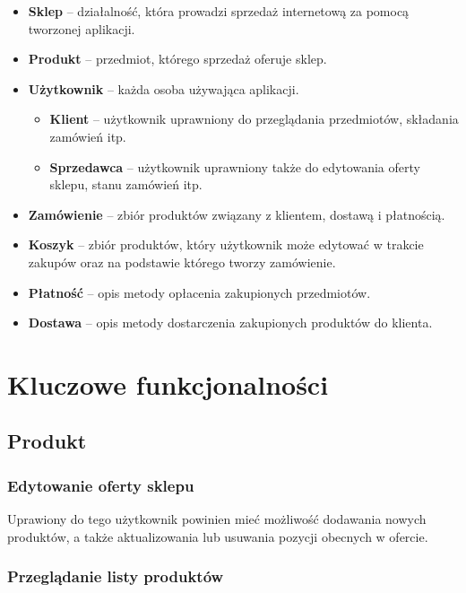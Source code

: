 \documentclass[a4paper]{article}
\begin{document}
\begin{itemize}
	\item \textbf{Sklep} -- działalność, która prowadzi sprzedaż internetową za pomocą 
	tworzonej aplikacji.
	\item \textbf{Produkt} -- przedmiot, którego sprzedaż oferuje sklep.
	\item \textbf{Użytkownik} -- każda osoba używająca aplikacji.
	\begin{itemize}
		\item \textbf{Klient} -- użytkownik uprawniony do przeglądania przedmiotów, 
		składania zamówień itp.
		\item \textbf{Sprzedawca} -- użytkownik uprawniony także do edytowania oferty 
		sklepu, stanu zamówień itp.
	\end{itemize}
	\item \textbf{Zamówienie} -- zbiór produktów związany z klientem, dostawą i 
	płatnością.
	\item \textbf{Koszyk} -- zbiór produktów, który użytkownik może edytować w trakcie 
	zakupów oraz na podstawie którego tworzy zamówienie.
	\item \textbf{Płatność} -- opis metody opłacenia zakupionych przedmiotów.
	\item \textbf{Dostawa} -- opis metody dostarczenia zakupionych produktów do klienta.
\end{itemize}

\section{Kluczowe funkcjonalności}

\subsection{Produkt}

\subsubsection{Edytowanie oferty sklepu}

Uprawiony do tego użytkownik powinien mieć możliwość dodawania nowych produktów, a także aktualizowania lub usuwania pozycji obecnych w ofercie.

\subsubsection{Przeglądanie listy produktów}
\end{document}
